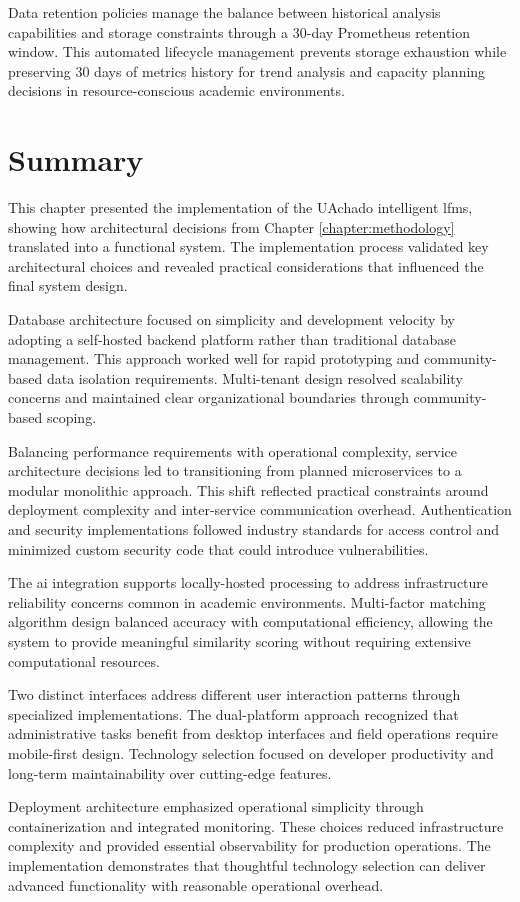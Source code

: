 Data retention policies manage the balance between historical analysis capabilities and storage constraints through a 30-day Prometheus retention window. This automated lifecycle management prevents storage exhaustion while preserving 30 days of metrics history for trend analysis and capacity planning decisions in resource-conscious academic environments.

\section{Summary} \label{section:implementation_summary}

This chapter presented the implementation of the UAchado intelligent \ac{lfms}, showing how architectural decisions from Chapter \ref{chapter:methodology}  translated into a functional system. The implementation process validated key architectural choices and revealed practical considerations that influenced the final system design.

Database architecture focused on simplicity and development velocity by adopting a self-hosted backend platform rather than traditional database management. This approach worked well for rapid prototyping and community-based data isolation requirements. Multi-tenant design resolved scalability concerns and maintained clear organizational boundaries through community-based scoping.
    
Balancing performance requirements with operational complexity, service architecture decisions led to transitioning from planned microservices to a modular monolithic approach. This shift reflected practical constraints around deployment complexity and inter-service communication overhead. Authentication and security implementations followed industry standards for access control and minimized custom security code that could introduce vulnerabilities.

The \ac{ai} integration supports locally-hosted processing to address infrastructure reliability concerns common in academic environments. Multi-factor matching algorithm design balanced accuracy with computational efficiency, allowing the system to provide meaningful similarity scoring without requiring extensive computational resources.

Two distinct interfaces address different user interaction patterns through specialized implementations. The dual-platform approach recognized that administrative tasks benefit from desktop interfaces and field operations require mobile-first design. Technology selection focused on developer productivity and long-term maintainability over cutting-edge features.

Deployment architecture emphasized operational simplicity through containerization and integrated monitoring. These choices reduced infrastructure complexity and provided essential observability for production operations. The implementation demonstrates that thoughtful technology selection can deliver advanced functionality with reasonable operational overhead.